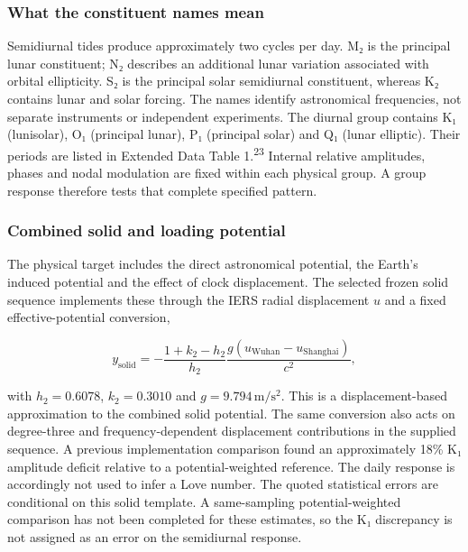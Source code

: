 \documentclass[
  12pt,
  a4paper,
]{article}
\begin{document}
\hypertarget{what-the-constituent-names-mean}{%
\subsubsection{What the constituent names
mean}\label{what-the-constituent-names-mean}}

Semidiurnal tides produce approximately two cycles per day. M₂ is the
principal lunar constituent; N₂ describes an additional lunar variation
associated with orbital ellipticity. S₂ is the principal solar
semidiurnal constituent, whereas K₂ contains lunar and solar forcing.
The names identify astronomical frequencies, not separate instruments or
independent experiments. The diurnal group contains K₁ (lunisolar), O₁
(principal lunar), P₁ (principal solar) and Q₁ (lunar elliptic). Their
periods are listed in Extended Data Table 1.\textsuperscript{23}
Internal relative amplitudes, phases and nodal modulation are fixed
within each physical group. A group response therefore tests that
complete specified pattern.

\hypertarget{combined-solid-and-loading-potential}{%
\subsubsection{Combined solid and loading
potential}\label{combined-solid-and-loading-potential}}

The physical target includes the direct astronomical potential, the
Earth's induced potential and the effect of clock displacement. The
selected frozen solid sequence implements these through the IERS radial
displacement \(u\) and a fixed effective-potential conversion,

\[y_{\mathrm{solid}}=-\frac{1+k_2-h_2}{h_2}\frac{g(u_{\mathrm{Wuhan}}-u_{\mathrm{Shanghai}})}{c^2},\]

with \(h_2=0.6078\), \(k_2=0.3010\) and \(g=9.794\,\mathrm{m/s^2}\).
This is a displacement-based approximation to the combined solid
potential. The same conversion also acts on degree-three and
frequency-dependent displacement contributions in the supplied sequence.
A previous implementation comparison found an approximately 18\% K₁
amplitude deficit relative to a potential-weighted reference. The daily
response is accordingly not used to infer a Love number. The quoted
statistical errors are conditional on this solid template. A
same-sampling potential-weighted comparison has not been completed for
these estimates, so the K₁ discrepancy is not assigned as an error on
the semidiurnal response.
\end{document}
